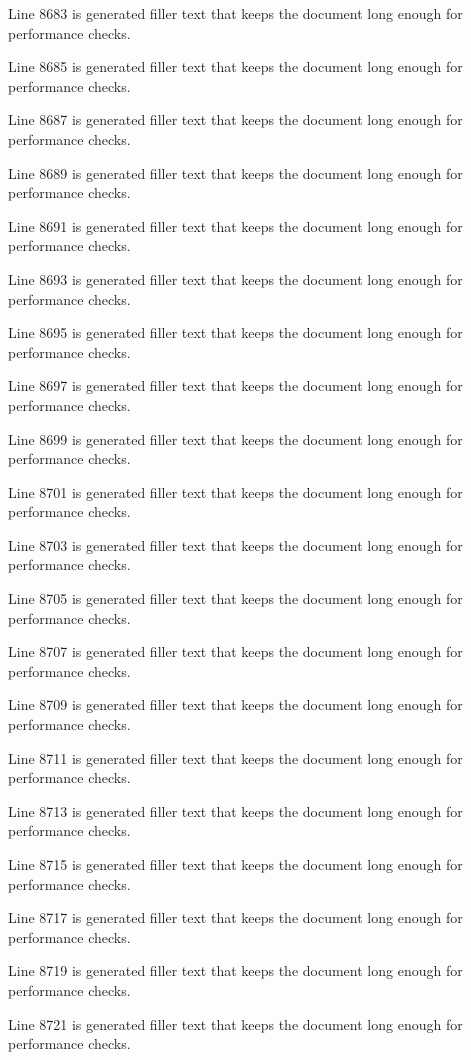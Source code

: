 Line 8683 is generated filler text that keeps the document long enough for performance checks.

Line 8685 is generated filler text that keeps the document long enough for performance checks.

Line 8687 is generated filler text that keeps the document long enough for performance checks.

Line 8689 is generated filler text that keeps the document long enough for performance checks.

Line 8691 is generated filler text that keeps the document long enough for performance checks.

Line 8693 is generated filler text that keeps the document long enough for performance checks.

Line 8695 is generated filler text that keeps the document long enough for performance checks.

Line 8697 is generated filler text that keeps the document long enough for performance checks.

Line 8699 is generated filler text that keeps the document long enough for performance checks.

Line 8701 is generated filler text that keeps the document long enough for performance checks.

Line 8703 is generated filler text that keeps the document long enough for performance checks.

Line 8705 is generated filler text that keeps the document long enough for performance checks.

Line 8707 is generated filler text that keeps the document long enough for performance checks.

Line 8709 is generated filler text that keeps the document long enough for performance checks.

Line 8711 is generated filler text that keeps the document long enough for performance checks.

Line 8713 is generated filler text that keeps the document long enough for performance checks.

Line 8715 is generated filler text that keeps the document long enough for performance checks.

Line 8717 is generated filler text that keeps the document long enough for performance checks.

Line 8719 is generated filler text that keeps the document long enough for performance checks.

Line 8721 is generated filler text that keeps the document long enough for performance checks.

